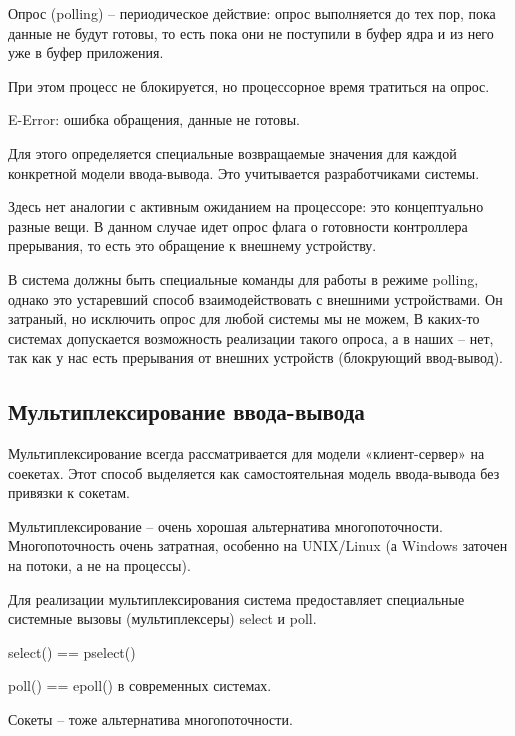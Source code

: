 Опрос (polling) – периодическое действие: опрос выполняется до тех пор, пока данные не будут готовы, то есть пока они не поступили в буфер ядра и из него уже в буфер приложения.

При этом процесс не блокируется, но процессорное время тратиться на опрос. 

E-Error: ошибка обращения, данные не готовы.

Для этого определяется специальные возвращаемые значения для каждой конкретной модели ввода-вывода. Это учитывается разработчиками системы.

Здесь нет аналогии с активным ожиданием на процессоре: это концептуально разные вещи. В данном случае идет опрос флага о готовности контроллера прерывания, то есть это обращение к внешнему устройству.

В система должны быть специальные команды для работы в режиме polling, однако это устаревший способ взаимодействовать с внешними устройствами. Он затраный, но исключить опрос для любой системы мы не можем, В каких-то системах допускается возможность реализации такого опроса, а в наших – нет, так как у нас есть прерывания от внешних устройств (блокрующий ввод-вывод).

\subsection{Мультиплексирование ввода-вывода}

Мультиплексирование всегда рассматривается для модели «клиент-сервер» на соекетах. Этот способ выделяется как самостоятельная модель ввода-вывода без привязки к сокетам.                                                  

Мультиплексирование – очень хорошая альтернатива многопоточности. Многопоточность очень затратная, особенно на UNIX/Linux (а Windows заточен на потоки, а не на процессы).

Для реализации мультиплексирования система предоставляет специальные системные вызовы (мультиплексеры) select и poll.

select() == pselect()

poll() == epoll() в современных системах.

Сокеты – тоже альтернатива многопоточности.

